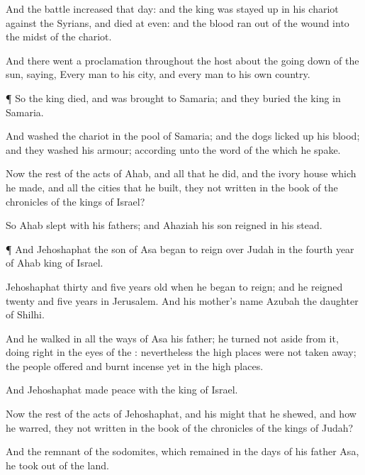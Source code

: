 {And the
battle
increased that
day: and the
king was stayed
up in his
chariot
against the
Syrians, and
died at
even: and the
blood ran
out of the
wound into the
midst of the
chariot.

And there
went a
proclamation throughout the
host about the going
down of the
sun,
saying, Every
man to his
city, and every
man to his own
country.


\par }{\PP {}¶ So the
king
died, and was
brought to
Samaria; and they
buried the
king in
Samaria.

And
{}
washed the
chariot in the
pool of
Samaria; and the
dogs licked
up his
blood; and they
washed his
armour; according unto the
word of the
{} which he
spake.

Now the
rest of the
acts of
Ahab, and all that he
did, and the
ivory
house which he
made, and all the
cities that he
built,
{} they not
written in the
book of the
chronicles of the
kings of
Israel?

So
Ahab
slept with his
fathers; and
Ahaziah his
son
reigned in his stead.


\par }{\PP {}¶ And
Jehoshaphat the
son of
Asa began to
reign over
Judah in the
fourth
year of
Ahab
king of
Israel.

Jehoshaphat
{}
thirty and
five
years
old when he began to
reign; and he
reigned
twenty and
five
years in
Jerusalem. And his
mother’s
name
{}
Azubah the
daughter of
Shilhi.

And he
walked in all the
ways of
Asa his
father; he turned not
aside from it,
doing
{}
right in the
eyes of the
{}: nevertheless the high
places were not taken
away;
{} the
people
offered and burnt
incense yet in the high
places.

And
Jehoshaphat made
peace with the
king of
Israel.

Now the
rest of the
acts of
Jehoshaphat, and his
might that he
shewed, and how he
warred,
{} they not
written in the
book of the
chronicles of the
kings of
Judah?

And the
remnant of the
sodomites, which
remained in the
days of his
father
Asa, he
took out of the
land.

}
